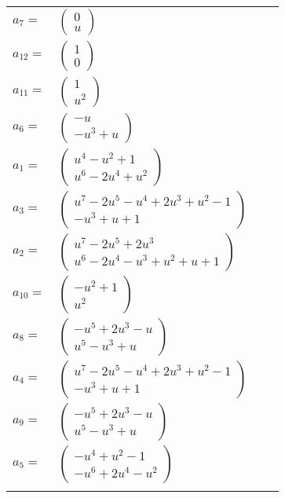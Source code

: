 \documentclass[1p]{elsarticle_modified}
\theoremstyle{definition}
\begin{document}
\begin{tabular}{m{7pt} m{180pt} m{7pt} m{180pt} }
\flushright $a_{7}=$&$\begin{pmatrix}0\\u\end{pmatrix}$ \\
\flushright $a_{12}=$&$\begin{pmatrix}1\\0\end{pmatrix}$ \\
\flushright $a_{11}=$&$\begin{pmatrix}1\\u^2\end{pmatrix}$ \\
\flushright $a_{6}=$&$\begin{pmatrix}- u\\- u^3+u\end{pmatrix}$ \\
\flushright $a_{1}=$&$\begin{pmatrix}u^4- u^2+1\\u^6-2 u^4+u^2\end{pmatrix}$ \\
\flushright $a_{3}=$&$\begin{pmatrix}u^7-2 u^5- u^4+2 u^3+u^2-1\\- u^3+u+1\end{pmatrix}$ \\
\flushright $a_{2}=$&$\begin{pmatrix}u^7-2 u^5+2 u^3\\u^6-2 u^4- u^3+u^2+u+1\end{pmatrix}$ \\
\flushright $a_{10}=$&$\begin{pmatrix}- u^2+1\\u^2\end{pmatrix}$ \\
\flushright $a_{8}=$&$\begin{pmatrix}- u^5+2 u^3- u\\u^5- u^3+u\end{pmatrix}$ \\
\flushright $a_{4}=$&$\begin{pmatrix}u^7-2 u^5- u^4+2 u^3+u^2-1\\- u^3+u+1\end{pmatrix}$ \\
\flushright $a_{9}=$&$\begin{pmatrix}- u^5+2 u^3- u\\u^5- u^3+u\end{pmatrix}$ \\
\flushright $a_{5}=$&$\begin{pmatrix}- u^4+u^2-1\\- u^6+2 u^4- u^2\end{pmatrix}$\\&\end{tabular}
\end{document}
